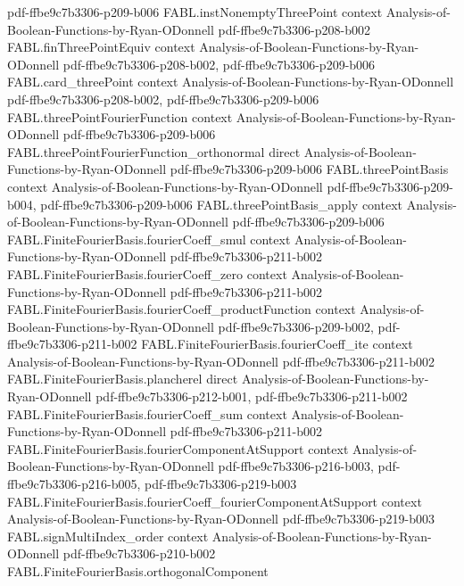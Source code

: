 \begin{theorem}
{    pdf-ffbe9c7b3306-p209-b006}
\proofstep
  {FABL.instNonemptyThreePoint}
  {context}
  {Analysis-of-Boolean-Functions-by-Ryan-ODonnell}
  {pdf-ffbe9c7b3306-p208-b002}
\proofstep
  {FABL.finThreePointEquiv}
  {context}
  {Analysis-of-Boolean-Functions-by-Ryan-ODonnell}
  {pdf-ffbe9c7b3306-p208-b002,
    pdf-ffbe9c7b3306-p209-b006}
\proofstep
  {FABL.card_threePoint}
  {context}
  {Analysis-of-Boolean-Functions-by-Ryan-ODonnell}
  {pdf-ffbe9c7b3306-p208-b002,
    pdf-ffbe9c7b3306-p209-b006}
\proofstep
  {FABL.threePointFourierFunction}
  {context}
  {Analysis-of-Boolean-Functions-by-Ryan-ODonnell}
  {pdf-ffbe9c7b3306-p209-b006}
\proofstep
  {FABL.threePointFourierFunction_orthonormal}
  {direct}
  {Analysis-of-Boolean-Functions-by-Ryan-ODonnell}
  {pdf-ffbe9c7b3306-p209-b006}
\proofstep
  {FABL.threePointBasis}
  {context}
  {Analysis-of-Boolean-Functions-by-Ryan-ODonnell}
  {pdf-ffbe9c7b3306-p209-b004,
    pdf-ffbe9c7b3306-p209-b006}
\proofstep
  {FABL.threePointBasis_apply}
  {context}
  {Analysis-of-Boolean-Functions-by-Ryan-ODonnell}
  {pdf-ffbe9c7b3306-p209-b006}
\proofstep
  {FABL.FiniteFourierBasis.fourierCoeff_smul}
  {context}
  {Analysis-of-Boolean-Functions-by-Ryan-ODonnell}
  {pdf-ffbe9c7b3306-p211-b002}
\proofstep
  {FABL.FiniteFourierBasis.fourierCoeff_zero}
  {context}
  {Analysis-of-Boolean-Functions-by-Ryan-ODonnell}
  {pdf-ffbe9c7b3306-p211-b002}
\proofstep
  {FABL.FiniteFourierBasis.fourierCoeff_productFunction}
  {context}
  {Analysis-of-Boolean-Functions-by-Ryan-ODonnell}
  {pdf-ffbe9c7b3306-p209-b002,
    pdf-ffbe9c7b3306-p211-b002}
\proofstep
  {FABL.FiniteFourierBasis.fourierCoeff_ite}
  {context}
  {Analysis-of-Boolean-Functions-by-Ryan-ODonnell}
  {pdf-ffbe9c7b3306-p211-b002}
\proofstep
  {FABL.FiniteFourierBasis.plancherel}
  {direct}
  {Analysis-of-Boolean-Functions-by-Ryan-ODonnell}
  {pdf-ffbe9c7b3306-p212-b001,
    pdf-ffbe9c7b3306-p211-b002}
\proofstep
  {FABL.FiniteFourierBasis.fourierCoeff_sum}
  {context}
  {Analysis-of-Boolean-Functions-by-Ryan-ODonnell}
  {pdf-ffbe9c7b3306-p211-b002}
\proofstep
  {FABL.FiniteFourierBasis.fourierComponentAtSupport}
  {context}
  {Analysis-of-Boolean-Functions-by-Ryan-ODonnell}
  {pdf-ffbe9c7b3306-p216-b003,
    pdf-ffbe9c7b3306-p216-b005,
    pdf-ffbe9c7b3306-p219-b003}
\proofstep
  {FABL.FiniteFourierBasis.fourierCoeff_fourierComponentAtSupport}
  {context}
  {Analysis-of-Boolean-Functions-by-Ryan-ODonnell}
  {pdf-ffbe9c7b3306-p219-b003}
\proofstep
  {FABL.signMultiIndex_order}
  {context}
  {Analysis-of-Boolean-Functions-by-Ryan-ODonnell}
  {pdf-ffbe9c7b3306-p210-b002}
\proofstep
  {FABL.FiniteFourierBasis.orthogonalComponent}

\end{theorem}
